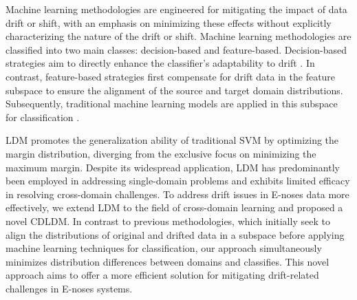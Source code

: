 \documentclass[a4paper]{cas-sc}
\begin{document}
Machine learning methodologies are engineered for mitigating the impact of data drift or shift, with an emphasis on minimizing these effects without explicitly characterizing the nature of the drift or shift. 
Machine learning methodologies are classified into two main classes: decision-based and feature-based. 
Decision-based strategies aim to directly enhance the classifier's adaptability to drift \citep{8846675, VERGARA2012320}. 
In contrast, feature-based strategies first compensate for drift data in the feature subspace to ensure the alignment of the source and target domain distributions.
Subsequently, traditional machine learning models are applied in this subspace for classification \citep{YAN2022107664, ZHANG2017407, GUO2022118237}.

LDM promotes the generalization ability of traditional SVM by optimizing the margin distribution, diverging from the exclusive focus on minimizing the maximum margin. Despite its widespread application, LDM has predominantly been employed in addressing single-domain problems and exhibits limited efficacy in resolving cross-domain challenges. To address drift issues in E-noses data more effectively, we extend LDM to the field of cross-domain learning and proposed a novel CDLDM. In contrast to previous methodologies, which initially seek to align the distributions of original and drifted data in a subspace before applying machine learning techniques for classification, our approach simultaneously minimizes distribution differences between domains and classifies. This novel approach aims to offer a more efficient solution for mitigating drift-related challenges in E-noses systems.






\end{document}
